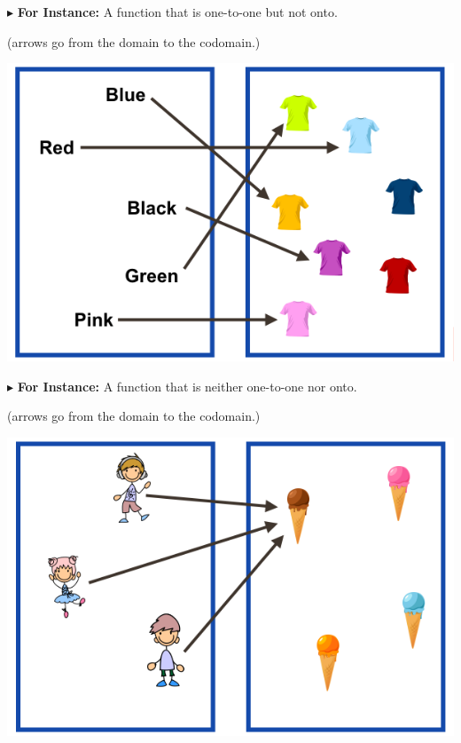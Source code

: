 \documentclass{ximera}
\begin{document}
$\blacktriangleright$ \textbf{For Instance:} A function that is one-to-one but not onto.  \\

\begin{center}
(arrows go from the domain to the codomain.)
\begin{image}
\includegraphics{pics/onetoone.png}
\end{image}
\end{center}








$\blacktriangleright$ \textbf{For Instance:} A function that is neither one-to-one nor onto.  \\

\begin{center}
(arrows go from the domain to the codomain.)
\begin{image}
\includegraphics{pics/neither.png}
\end{image}
\end{center}
\end{document}
